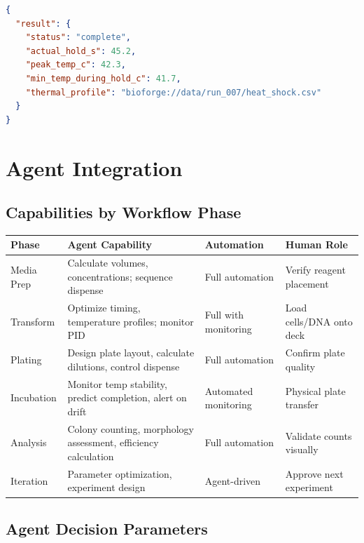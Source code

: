 \documentclass[11pt,letterpaper]{article}
\begin{document}
\begin{lstlisting}[language=json, title={\small\sffamily MCP Server $\rightarrow$ Agent: Completion result}]
{
  "result": {
    "status": "complete",
    "actual_hold_s": 45.2,
    "peak_temp_c": 42.3,
    "min_temp_during_hold_c": 41.7,
    "thermal_profile": "bioforge://data/run_007/heat_shock.csv"
  }
}
\end{lstlisting}


\section{Agent Integration}

\subsection{Capabilities by Workflow Phase}

\begin{xltabular}{\textwidth}{L{2.0cm} Y L{3.2cm} L{3.8cm}}
\toprule
\textbf{Phase} & \textbf{Agent Capability} & \textbf{Automation} & \textbf{Human Role} \\
\midrule
\endhead
Media Prep & Calculate volumes, concentrations; sequence dispense & Full automation & Verify reagent placement \\
Transform & Optimize timing, temperature profiles; monitor PID & Full with monitoring & Load cells/DNA onto deck \\
Plating & Design plate layout, calculate dilutions, control dispense & Full automation & Confirm plate quality \\
Incubation & Monitor temp stability, predict completion, alert on drift & Automated monitoring & Physical plate transfer \\
Analysis & Colony counting, morphology assessment, efficiency calculation & Full automation & Validate counts visually \\
Iteration & Parameter optimization, experiment design & Agent-driven & Approve next experiment \\*
\bottomrule
\end{xltabular}

\subsection{Agent Decision Parameters}
\end{document}
